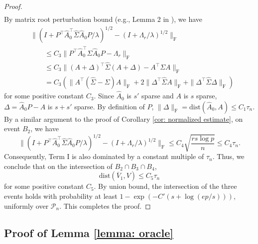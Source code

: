 \documentclass[11pt]{article}
\newcommand{\nb}[1]{\textcolor{orange}{\texttt{[#1]}}}
\newcommand{\init}{\widehat{A}_0}
\newcommand{\scale}{V}
\newcommand{\gd}{\overline{V}}
\newcommand{\0}{{\mathbf{0}}}
\newcommand{\ssecond}{{\widehat{\Sigma}}}
\begin{document}
\begin{proof}
\begin{align*}
\end{align*}
By matrix root perturbation bound (e.g., Lemma 2 in \cite{gao2017sparse}), we have 
\begin{align*}
& \|(I+{P^\top  \init ^\top\ssecond\init P}/{\lambda})^{1/2}
-(I+{\Lambda_r}/{\lambda})^{1/2}\|_\mathrm{F} \\
& \qquad \leq C_3\|P^\top  \init ^\top\ssecond\init P-\Lambda_r\|_\mathrm{F}\\
& \qquad \leq C_3\|(A+\Delta)^\top  \ssecond(A+\Delta)-A^\top\Sigma A\|_\mathrm{F}\\
& \qquad =C_3(\|A^\top(\ssecond-\Sigma) A\|_\mathrm{F}   +2\|\Delta^\top  \ssecond A\|_\mathrm{F}+\|\Delta^\top  \ssecond\Delta\|_\mathrm{F})
\end{align*}
for some positive constant $C_3$. 
Since $\init $ is $s'$ sparse and $A$ is $s$ sparse, 
$\Delta = \init  P - A$ is $s+s'$ sparse. 
By definition of $P$, $\|\Delta\|_\mathrm{F} = \mathrm{dist}(\init , A)\leq C_1\tau_n$. 
By a similar argument to the proof of Corollary \ref{cor: normalized estimate}, on event $B_2$, we have
\begin{equation*}
\|(I+{P^\top  \init ^\top\ssecond\init P}/{\lambda})^{1/2}-(I+{\Lambda_r}/{\lambda})^{1/2}\|_\mathrm{F}\leq C_4\sqrt{\frac{rs\log p}{n}}\leq C_4\tau_n.
\end{equation*} 
Consequently, Term I is also dominated by a constant multiple of $\tau_n$. 
Thus, we conclude that on the intersection of 
$B_2\cap B_3\cap B_4$, 
\begin{equation*}
\mathrm{dist}(\gd_1, \scale)\leq C_5\tau_n
\end{equation*}
for some positive constant $C_5$.  
By union bound, the intersection of the three events holds with probability at least $1-\exp(-C'(s+\log (ep/s)))$, uniformly over $\mathcal{P}_n$.
This completes the proof.
\end{proof}

\subsection{Proof of Lemma \ref{lemma: oracle}}
\label{sec:proof-lemma-oracle}
\end{document}
